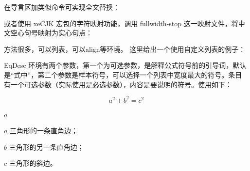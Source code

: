 在导言区加类似命令可实现全文替换：


或者使用 xeCJK 宏包的字符映射功能，调用 fullwidth-stop
这一映射文件，将中文空心句号映射为实心句点：




方法很多，可以列表，可以align等环境。 这里给出一个使用自定义列表的例子：

\begin{texlist}
\usepackage{ifthen}
\newenvironment{EqDesc}[2][式中]{%
\begin{list}{}
 {%
  \usecounter{qlst}
  \settowidth{\labelwidth}{#1，\ \ #2\ --- \ }
  \setlength{\labelsep}{0pt}
  \setlength{\leftmargin}{\labelwidth}
  \setlength{\rightmargin}{0em}
  \setlength{\parsep}{0ex}
  \setlength{\itemsep}{0ex}
  \setlength{\itemindent}{0em}
  \setlength{\listparindent}{0em}
  \renewcommand{\makelabel}[1]
    {\stepcounter{qlst}
     \ifthenelse{\value{qlst}>1}{\hfill ##1\ --- \ }{#1，\hfill ##1\ --- \ }
    }
 }%
}%
{\end{list}}
\end{texlist}

EqDesc
环境有两个参数，第一个为可选参数，是解释公式符号前的引导词，默认是``式中''，第二个参数是样本符号，可以选择一个列表中宽度最大的符号。条目  有一个可选参数（实际使用是必选参数），内容是要说明的符号。使用如下：

\begin{example}
\[ a^2+b^2=c^2 \]
\begin{EqDesc}[其中]{$a$}
   \item[$a$] 三角形的一条直角边；
   \item[$b$] 三角形的另一条直角边；
   \item[$c$] 三角形的斜边。
\end{EqDesc}
\end{example}

